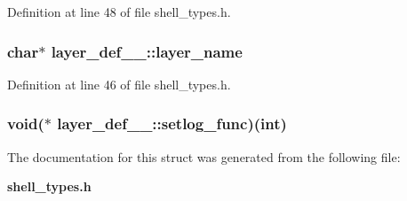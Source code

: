 Definition at line 48 of file shell\_\-types.h.
\subsubsection[{layer\_\-name}]{\setlength{\rightskip}{0pt plus 5cm}char$\ast$ {\bf layer\_\-def\_\-\_\-::layer\_\-name}}\label{structlayer__def_____ae3ce826183c3bd6b126511808dd1e449}


Definition at line 46 of file shell\_\-types.h.
\subsubsection[{setlog\_\-func}]{\setlength{\rightskip}{0pt plus 5cm}void($\ast$ {\bf layer\_\-def\_\-\_\-::setlog\_\-func})(int)}\label{structlayer__def_____a30ae5403c54841f30e5f22361c8b1ee5}


The documentation for this struct was generated from the following file:\begin{DoxyCompactItemize}
\item 
{\bf shell\_\-types.h}\end{DoxyCompactItemize}
